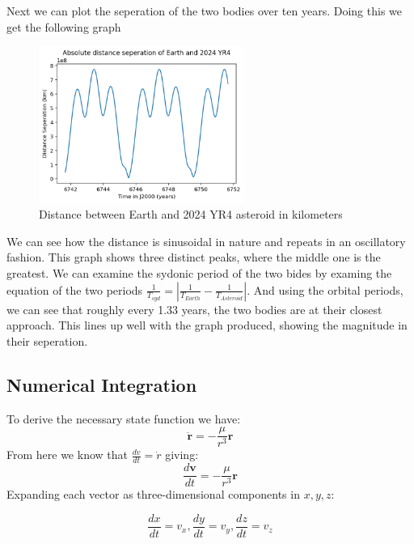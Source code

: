 \documentclass[a4paper, 12pt]{article}  %
\begin{document}
\noindent Next we can plot the seperation of the two bodies over ten years. Doing this we get the following graph

\begin{figure}[H]
    \centering
    \includegraphics[width=0.6\textwidth]{Images/115-dis.png}
    \caption{Distance between Earth and 2024 YR4 asteroid in kilometers}
    \label{fig:example}
\end{figure}

\noindent We can see how the distance is sinusoidal in nature and repeats in an oscillatory fashion. 
This graph shows three distinct peaks, where the middle one is the greatest. We can examine the sydonic period of 
the two bides by examing the equation of the two periods $\frac{1}{T_{syd}} = |\frac{1}{T_{Earth}} - \frac{1}{T_{Asteroid}}|$. And using the orbital periods,
we can see that roughly every 1.33 years, the two bodies are at their closest approach. This lines up well with the graph produced,
showing the magnitude in their seperation. 


\subsection{Numerical Integration}
To derive the necessary state function we have:
\begin{equation}
    \ddot{\mathbf{r}} = -\frac{\mu}{r^3} \mathbf{r}
\end{equation}
From here we know that $\frac{dv}{dt} = \dot{r}$ giving:
\begin{equation}
    \frac{d\mathbf{v}}{dt} = -\frac{\mu}{r^3} \mathbf{r}
\end{equation}
Expanding each vector as three-dimensional components in $x,y,z$:

\begin{equation}
    \frac{dx}{dt} = v_{x},  \frac{dy}{dt} = v_{y},   \frac{dz}{dt} = v_{z}
\end{equation}
\end{document}
